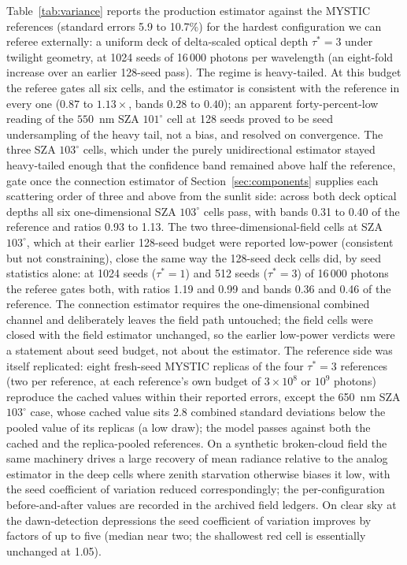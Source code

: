 \documentclass[preprint,12pt]{elsarticle}
\begin{document}
Table~\ref{tab:variance} reports the production estimator against the
MYSTIC references (standard errors 5.9 to 10.7\%) for the hardest
configuration we can referee externally: a uniform deck of
delta-scaled optical depth $\tau^{*} = 3$ under twilight geometry, at
1024 seeds of 16\,000 photons per wavelength (an eight-fold increase
over an earlier 128-seed pass). The regime is heavy-tailed. At this
budget the referee gates all six cells, and the
estimator is consistent with the reference in every one ($0.87$ to
$1.13\times$, bands $0.28$ to $0.40$); an apparent forty-percent-low
reading of the $550$~nm SZA $101^\circ$ cell at 128 seeds proved to be
seed undersampling of the heavy tail, not a bias, and resolved on
convergence. The three SZA $103^\circ$ cells, which under the purely
unidirectional estimator stayed heavy-tailed enough that the
confidence band remained above half the reference, gate once the
connection estimator of Section~\ref{sec:components} supplies each
scattering order of three and above from the sunlit side: across both
deck optical depths all six one-dimensional SZA $103^\circ$ cells
pass, with bands 0.31 to 0.40 of the reference and ratios 0.93 to
1.13. The two three-dimensional-field cells at SZA $103^\circ$, which
at their earlier 128-seed budget were reported low-power (consistent
but not constraining), close the same way the 128-seed deck cells
did, by seed statistics alone: at 1024 seeds ($\tau^{*}=1$) and 512
seeds ($\tau^{*}=3$) of 16\,000 photons the referee gates both, with
ratios 1.19 and 0.99 and bands 0.36 and 0.46 of the reference. The
connection estimator requires the one-dimensional combined channel
and deliberately leaves the field path untouched; the field cells
were closed with the field estimator unchanged, so the earlier
low-power verdicts were a statement about seed budget, not about the
estimator. The reference side was
itself replicated: eight fresh-seed MYSTIC replicas of the four
$\tau^{*}=3$ references (two per reference, at each reference's own
budget of $3\times10^{8}$ or $10^{9}$ photons) reproduce the cached
values within their reported errors, except the 650~nm SZA $103^\circ$
case, whose cached value sits 2.8 combined standard deviations below
the pooled value of its replicas (a low draw); the model passes
against both the cached and the replica-pooled references. On a
synthetic broken-cloud field the same machinery drives a large recovery
of mean radiance relative to the analog estimator in the deep cells where
zenith starvation otherwise biases it low, with the seed coefficient of
variation reduced correspondingly; the per-configuration before-and-after
values are recorded in the archived field ledgers. On clear sky at
the dawn-detection
depressions the seed coefficient of variation improves by factors of up
to five (median near two; the shallowest red cell is essentially
unchanged at 1.05).
\end{document}
